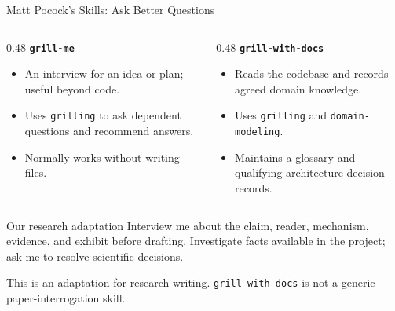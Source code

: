 \begin{frame}{Matt Pocock's Skills: Ask Better Questions}
\begin{columns}[t]
\begin{column}{0.48\textwidth}
\textbf{\texttt{grill-me}}
\begin{itemize}
\item An interview for an idea or plan; useful beyond code.
\item Uses \texttt{grilling} to ask dependent questions and recommend answers.
\item Normally works without writing files.
\end{itemize}
\end{column}
\begin{column}{0.48\textwidth}
\textbf{\texttt{grill-with-docs}}
\begin{itemize}
\item Reads the codebase and records agreed domain knowledge.
\item Uses \texttt{grilling} and \texttt{domain-modeling}.
\item Maintains a glossary and qualifying architecture decision records.
\end{itemize}
\end{column}
\end{columns}
\par\vspace{0.3cm}
\begin{block}{Our research adaptation}
Interview me about the claim, reader, mechanism, evidence, and exhibit before drafting. Investigate facts available in the project; ask me to resolve scientific decisions.
\end{block}
\small This is an adaptation for research writing. \texttt{grill-with-docs} is not a generic paper-interrogation skill.
\par\vfill
{}
\end{frame}

